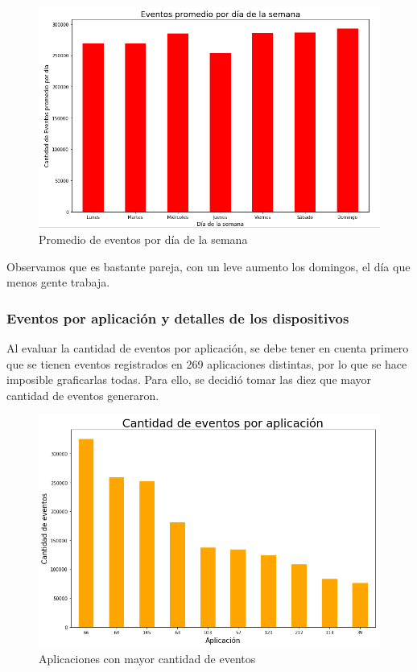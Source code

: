 \documentclass[a4paper, 12pt]{article}
\begin{document}
		\FloatBarrier
		\begin{figure}[h]
			\centering
			\includegraphics[width=\textwidth]{images/events/eventsxdia.png}
			\caption{Promedio de eventos por día de la semana}
		\end{figure}
		\FloatBarrier
		
		Observamos que es bastante pareja, con un leve aumento los domingos, el día que menos gente trabaja.
		
	\subsubsection{Eventos por aplicación y detalles de los dispositivos}
	
		Al evaluar la cantidad de eventos por aplicación, se debe tener en cuenta primero que se tienen eventos registrados
		en 269 aplicaciones distintas, por lo que se hace imposible graficarlas todas. Para ello, se decidió tomar las
		diez que mayor cantidad de eventos generaron.
		
		\FloatBarrier
		\begin{figure}[h]
			\centering
			\includegraphics[width=\textwidth]{images/events/evxapp.png}
			\caption{Aplicaciones con mayor cantidad de eventos}
		\end{figure}
		\FloatBarrier
		
\end{document}
